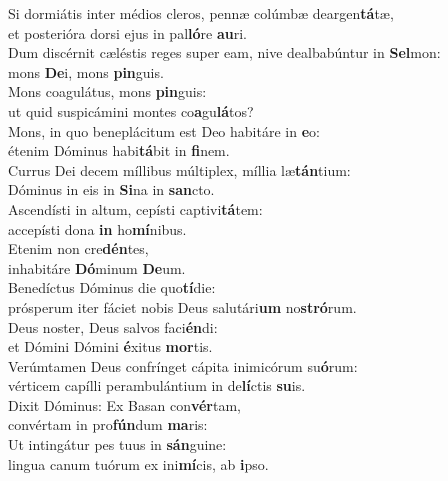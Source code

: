\evenverse Si dormiátis inter médios cleros, pennæ colúmbæ deargen\textbf{tá}tæ,~\*\\
\evenverse et posterióra dorsi ejus in pal\textbf{ló}re \textbf{au}ri.\\
\oddverse Dum discérnit cæléstis reges super eam, nive dealbabúntur in \textbf{Sel}mon:~\*\\
\oddverse mons \textbf{De}i, mons \textbf{pin}guis.\\
\evenverse Mons coagulátus, mons \textbf{pin}guis:~\*\\
\evenverse ut quid suspicámini montes co\textbf{a}gu\textbf{lá}tos?\\
\oddverse Mons, in quo beneplácitum est Deo habitáre in \textbf{e}o:~\*\\
\oddverse étenim Dóminus habi\textbf{tá}bit in \textbf{fi}nem.\\
\evenverse Currus Dei decem míllibus múltiplex, míllia læ\textbf{tán}tium:~\*\\
\evenverse Dóminus in eis in \textbf{Si}na in \textbf{san}cto.\\
\oddverse Ascendísti in altum, cepísti captivi\textbf{tá}tem:~\*\\
\oddverse accepísti dona \textbf{in} ho\textbf{mí}nibus.\\
\evenverse Etenim non cre\textbf{dén}tes,~\*\\
\evenverse inhabitáre \textbf{Dó}minum \textbf{De}um.\\
\oddverse Benedíctus Dóminus die quo\textbf{tí}die:~\*\\
\oddverse prósperum iter fáciet nobis Deus salutári\textbf{um} no\textbf{stró}rum.\\
\evenverse Deus noster, Deus salvos faci\textbf{én}di:~\*\\
\evenverse et Dómini Dómini \textbf{é}xitus \textbf{mor}tis.\\
\oddverse Verúmtamen Deus confrínget cápita inimicórum su\textbf{ó}rum:~\*\\
\oddverse vérticem capílli perambulántium in de\textbf{lí}ctis \textbf{su}is.\\
\evenverse Dixit Dóminus: Ex Basan con\textbf{vér}tam,~\*\\
\evenverse convértam in pro\textbf{fún}dum \textbf{ma}ris:\\
\oddverse Ut intingátur pes tuus in \textbf{sán}guine:~\*\\
\oddverse lingua canum tuórum ex ini\textbf{mí}cis, ab \textbf{i}pso.\\
